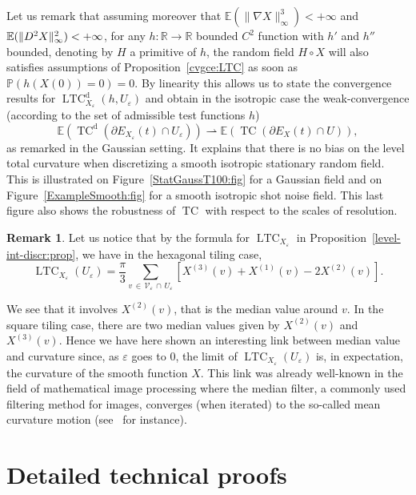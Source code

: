 \documentclass[10pt]{amsart}
\theoremstyle{definition}\newtheorem{defi}[theo]{Definition}\newtheorem{rema}[theo]{Remark}\newtheorem{exam}[theo]{Example}\newtheorem{exem}[theo]{Example}\newtheorem{nota}[theo]{Notation}
\newcommand{\R}{\mathbb{R}}
\newcommand{\bbP}{\mathbb{P}}
\newcommand{\E}{\mathbb{E}}
\newcommand{\eps}{\varepsilon}
\DeclareMathOperator{\TC}{TC}
\DeclareMathOperator{\LTC}{LTC}
\newcommand{\dd}{\mathrm{d}}
\newcommand{\calV}{\mathcal{V}}
\begin{document}
Let us remark that assuming moreover that $\E(\|\nabla X\|_\infty^3)<+\infty$ and $\E(\|D^2 X\|_\infty^2)\linebreak <+\infty$, for any $h:\R\rightarrow \R$ bounded $C^2$ function with $h'$ and $h''$ bounded, denoting by $H$ a primitive of $h$, the random field $H\circ X$ will also satisfies assumptions of Proposition~\ref{cvgce:LTC} as soon as $\bbP(h(X(0))=0)=0$. By linearity this allows us to state the convergence results for $\LTC^\dd_{X_\eps}(h,U_\eps)$ and obtain in the isotropic case the weak-convergence (according to the set of admissible test functions $h$)
\[
\E\left(\TC^\dd\left(\partial E_{X_\eps}(t)\cap U_\eps\right)\right)\rightharpoonup
\E\left(\TC(\partial E_{X}(t) \cap U)\right),
\]
as remarked in the Gaussian setting. It explains that there is no bias on the level total curvature when discretizing a smooth isotropic stationary random field. This is illustrated on Figure~\ref{StatGaussT100:fig} for a Gaussian field and on Figure~\ref{ExampleSmooth:fig} for a smooth isotropic shot noise field. This last figure also shows the robustness of $\TC$ with respect to the scales of resolution.



\begin{rema}
Let us notice that by the formula for $\LTC_{X_\eps}$ in Proposition~\ref{level-int-discr:prop}, we have in the hexagonal tiling case,
\[
\LTC_{X_\eps}(U_\eps)=\frac{\pi}{3}\sum_{v\,\in\, {\calV}_\eps\,\cap\,U_\eps} \left[X^{(3)}(v)+X^{(1)}(v)-2X^{(2)}(v)\right].
\]
\end{rema}

We see that it involves $X^{(2)}(v)$, that is the median value around $v$. In the square tiling case, there are two median values given by $X^{(2)}(v)$ and $X^{(3)}(v)$. Hence we have here shown an interesting link between median value and curvature since, as $\eps$ goes to $0$, the limit of $\LTC_{X_\eps}(U_\eps)$ is, in expectation, the curvature of the smooth function $X$. This link was already well-known in the field of mathematical image processing where the median filter, a commonly used filtering method for images, converges (when iterated) to the so-called mean curvature motion (see~\cite{Cao03a} for instance).
\vspace{10em}
\appendix
\section{Detailed technical proofs}
\end{document}
